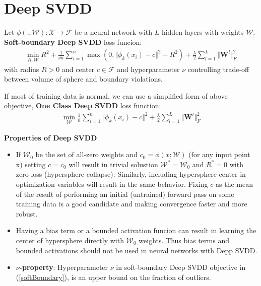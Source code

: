 \documentclass[a4]{article}
\begin{document}
\section{Deep SVDD}
Let $ \phi(.;\mathcal{W}) : \mathcal{X} \rightarrow \mathcal{F} $ be a neural network with $ L $ hidden layers with weights $ \mathcal{W} $.
\textbf{Soft-boundary Deep SVDD} loss funcion:
\begin{equation}
\begin{split}
\min_{R, \mathcal{W}} R^2 + \frac{1}{\nu n}\sum_{i=1}^{n} \max(0, \Vert\phi_k(x_i) - c\Vert ^2 - R^2) + \frac{\lambda}{2}\sum_{l=1}^{L}\Vert \mathbf{W}^l\Vert^2_F
\end{split}
\label{softBoundary}
\end{equation}
with radius $ R > 0 $ and center $ c \in \mathcal{F} $ and hyperparameter $ \nu $ controlling trade-off between volume of sphere and boundary violations.

If most of training data is normal, we can use a simplified form of above objective, \textbf{One Class Deep SVDD} loss function:
\begin{equation}
	\begin{split}
		\min_{\mathcal{W}} \frac{1}{n}\sum_{i=1}^{n} \Vert\phi_k(x_i) - c\Vert ^2 + \frac{\lambda}{2}\sum_{l=1}^{L}\Vert \mathbf{W}^l\Vert^2_F
	\end{split}
\end{equation}

\noindent
\textbf{Properties of Deep SVDD}\\
\begin{itemize}
\item 
If $ \mathcal{W}_0 $ be the set of all-zero weights and $ c_0 = \phi(x;\mathcal{W}) $ (for any input point x) setting $ c = c_0 $ will result in trivial solustion $ \mathcal{W}^* = \mathcal{W}_0$ and $ R^* = 0 $ with zero loss (hypersphere collapse). Similarly, including hypersphere center in optimization variables will result in the same behavior. Fixing $ c $ as the mean of the result of performing an initial (untrained) forward pass on some training data is a good candidate and making convergence faster and more robust.
\item Having a bias term or a bounded activation funcion can result in learning the center of hypersphere directly with $ \mathcal{W}_0 $ weights. Thus bias terms and bounded activations should not be used in neural networks with Depp SVDD.

\item \textbf{$ \nu $-property}: Hyperparameter $ \nu $ in soft-boundary Deep SVDD objective in (\ref{softBoundary}), is an upper bound on the fraction of outliers.
\end{itemize}
\end{document}
